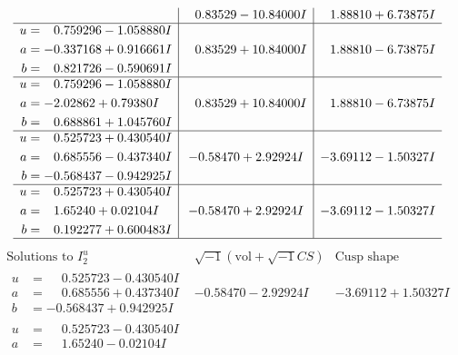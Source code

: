 \documentclass[1p]{elsarticle_modified}
\theoremstyle{definition}
\newcommand{\I}{\sqrt{-1}}
\begin{document}
$$\begin{array}{c|c|c}
 & \phantom{-}0.83529 - 10.84000 I & \phantom{-}1.88810 + 6.73875 I \\ \hline\begin{aligned}
u &= \phantom{-}0.759296 - 1.058880 I \\
a &= -0.337168 + 0.916661 I \\
b &= \phantom{-}0.821726 - 0.590691 I\end{aligned}
 & \phantom{-}0.83529 + 10.84000 I & \phantom{-}1.88810 - 6.73875 I \\ \hline\begin{aligned}
u &= \phantom{-}0.759296 - 1.058880 I \\
a &= -2.02862 + 0.79380 I \\
b &= \phantom{-}0.688861 + 1.045760 I\end{aligned}
 & \phantom{-}0.83529 + 10.84000 I & \phantom{-}1.88810 - 6.73875 I \\ \hline\begin{aligned}
u &= \phantom{-}0.525723 + 0.430540 I \\
a &= \phantom{-}0.685556 - 0.437340 I \\
b &= -0.568437 - 0.942925 I\end{aligned}
 & -0.58470 + 2.92924 I & -3.69112 - 1.50327 I \\ \hline\begin{aligned}
u &= \phantom{-}0.525723 + 0.430540 I \\
a &= \phantom{-}1.65240 + 0.02104 I \\
b &= \phantom{-}0.192277 + 0.600483 I\end{aligned}
 & -0.58470 + 2.92924 I & -3.69112 - 1.50327 I\\
 \hline 
 \end{array}$$\newpage$$\begin{array}{c|c|c}  
\text{Solutions to }I^u_{2}& \I (\text{vol} + \sqrt{-1}CS) & \text{Cusp shape}\\
 \hline 
\begin{aligned}
u &= \phantom{-}0.525723 - 0.430540 I \\
a &= \phantom{-}0.685556 + 0.437340 I \\
b &= -0.568437 + 0.942925 I\end{aligned}
 & -0.58470 - 2.92924 I & -3.69112 + 1.50327 I \\ \hline\begin{aligned}
u &= \phantom{-}0.525723 - 0.430540 I \\
a &= \phantom{-}1.65240 - 0.02104 I \\

\end{aligned}
\end{array}$$
\end{document}
